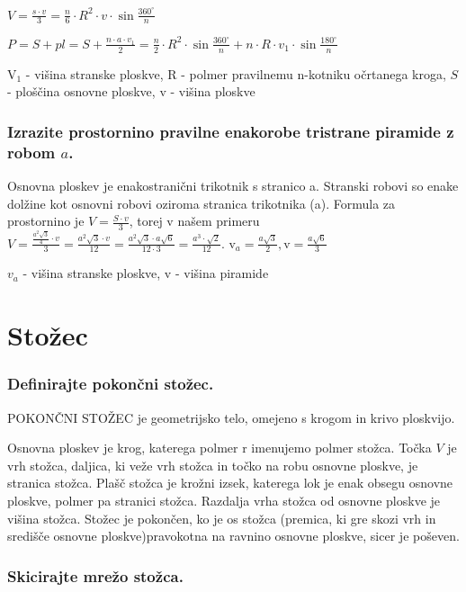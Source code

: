 \documentclass{article}
\begin{document}
$V=\frac{s \cdot v}{3}=\frac{n}{6} \cdot R^{2} \cdot v \cdot \sin \frac{360^{\circ}}{n}$

$P=S+p l=S+\frac{n \cdot a \cdot v_{1}}{2}=\frac{n}{2} \cdot R^{2} \cdot \sin \frac{360^{\circ}}{n}+n \cdot R \cdot v_{1} \cdot \sin \frac{180^{\circ}}{n}$

$\mathrm{V}_{1}$ - višina stranske ploskve, $\mathrm{R}$ - polmer pravilnemu n-kotniku očrtanega kroga, $S$ - ploščina osnovne ploskve, v - višina ploskve


\subsubsection*{Izrazite prostornino pravilne enakorobe tristrane piramide z robom $a$.}

Osnovna ploskev je enakostranični trikotnik s stranico a. Stranski robovi so enake dolžine kot osnovni robovi oziroma stranica trikotnika (a). Formula za prostornino je $V=\frac{S \cdot v}{3}$, torej v našem primeru $V=\frac{\frac{a^{2} \sqrt{3}}{4} \cdot v}{3}=\frac{a^{2} \sqrt{3} \cdot v}{12}=\frac{a^{2} \sqrt{3} \cdot a \sqrt{6}}{12 \cdot 3}=\frac{a^{3} \cdot \sqrt{2}}{12}$. $\mathrm{v}_{a}=\frac{a \sqrt{3}}{2}, \mathrm{v}=\frac{a \sqrt{6}}{3}$

$v_{a}$ - višina stranske ploskve, v - višina piramide

\section{Stožec}
\subsubsection*{Definirajte pokončni stožec.}


POKONČNI STOŽEC je geometrijsko telo, omejeno s krogom in krivo ploskvijo.

Osnovna ploskev je krog, katerega polmer r imenujemo polmer stožca. Točka $V$ je vrh stožca, daljica, ki veže vrh stožca in točko na robu osnovne ploskve, je stranica stožca. Plašč stožca je krožni izsek, katerega lok je enak obsegu osnovne ploskve, polmer pa stranici stožca. Razdalja vrha stožca od osnovne ploskve je višina stožca. Stožec je pokončen, ko je os stožca (premica, ki gre skozi vrh in središče osnovne ploskve)pravokotna na ravnino osnovne ploskve, sicer je poševen.

\subsubsection*{Skicirajte mrežo stožca.}
\end{document}
